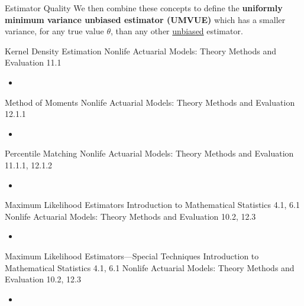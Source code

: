 \begin{CHPT_SUMM_AUTO_NUMB}[label = {L.-25}]{Estimator Quality}
We then combine these concepts to define the \textbf{uniformly minimum variance unbiased estimator (UMVUE)} which has a smaller variance, for any true value $\theta$, than any other \underline{unbiased} estimator.
\end{CHPT_SUMM_AUTO_NUMB}

\begin{CHPT_SUMM_AUTO_NUMB}[label = {L.-26}]{Kernel Density Estimation}
Nonlife Actuarial Models: Theory Methods and Evaluation 11.1
	\begin{itemize}
		\item	
	\end{itemize}
\end{CHPT_SUMM_AUTO_NUMB}

\begin{CHPT_SUMM_AUTO_NUMB}[label = {L.-27}]{Method of Moments}
Nonlife Actuarial Models: Theory Methods and Evaluation 12.1.1
	\begin{itemize}
		\item	
	\end{itemize}
\end{CHPT_SUMM_AUTO_NUMB}

\begin{CHPT_SUMM_AUTO_NUMB}[label = {L.-28}]{Percentile Matching}
Nonlife Actuarial Models: Theory Methods and Evaluation 11.1.1, 12.1.2
	\begin{itemize}
		\item	
	\end{itemize}
\end{CHPT_SUMM_AUTO_NUMB}

\begin{CHPT_SUMM_AUTO_NUMB}[label = {L.-29}]{Maximum Likelihood Estimators}
Introduction to Mathematical Statistics 4.1, 6.1
Nonlife Actuarial Models: Theory Methods and Evaluation 10.2, 12.3
	\begin{itemize}
		\item	
	\end{itemize}
\end{CHPT_SUMM_AUTO_NUMB}

\begin{CHPT_SUMM_AUTO_NUMB}[label = {L.-30}]{Maximum Likelihood Estimators---Special Techniques}
Introduction to Mathematical Statistics 4.1, 6.1
Nonlife Actuarial Models: Theory Methods and Evaluation 10.2, 12.3
	\begin{itemize}
		\item	
	\end{itemize}
\end{CHPT_SUMM_AUTO_NUMB}

